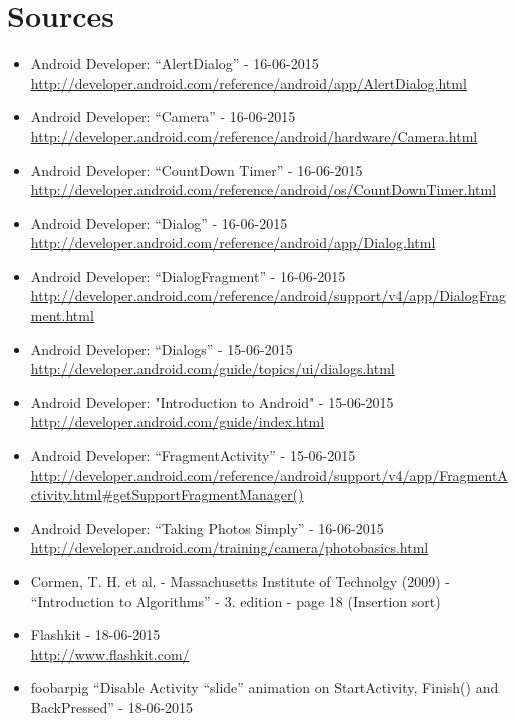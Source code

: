 \section{Sources}
\begin{itemize}
	\item Android Developer: “AlertDialog” - 16-06-2015 \\ \url{http://developer.android.com/reference/android/app/AlertDialog.html}	
	\item Android Developer: “Camera” - 16-06-2015 \\
\url{http://developer.android.com/reference/android/hardware/Camera.html}	
	\item Android Developer: “CountDown Timer” - 16-06-2015 \\ \url{http://developer.android.com/reference/android/os/CountDownTimer.html}
	\item Android Developer: “Dialog” - 16-06-2015 \\ \url{http://developer.android.com/reference/android/app/Dialog.html}	
	\item Android Developer: “DialogFragment” - 16-06-2015 \\ \url{http://developer.android.com/reference/android/support/v4/app/DialogFragment.html}	
	\item Android Developer: “Dialogs” - 15-06-2015 \\ \url{http://developer.android.com/guide/topics/ui/dialogs.html}	
	\item Android Developer: "Introduction to Android" - 15-06-2015 \\ \url{http://developer.android.com/guide/index.html}	
	\item Android Developer: “FragmentActivity” - 15-06-2015 \\ \url{http://developer.android.com/reference/android/support/v4/app/FragmentActivity.html#getSupportFragmentManager()}
	\item Android Developer: “Taking Photos Simply” - 16-06-2015 \\ \url{http://developer.android.com/training/camera/photobasics.html}
	\item Cormen, T. H. et al. - Massachusetts Institute of Technolgy (2009) - “Introduction to Algorithms” - 3. edition - page 18 (Insertion sort) 
	\item Flashkit - 18-06-2015 \\
\url{http://www.flashkit.com/}
	\item foobarpig “Disable Activity “slide” animation on StartActivity, Finish() and BackPressed” - 18-06-2015 \\

\end{itemize}
